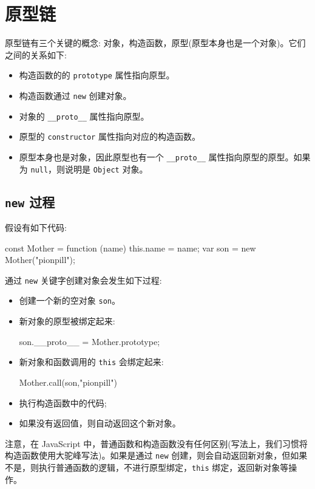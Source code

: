 \section{原型链}

原型链有三个关键的概念: 对象，构造函数，原型(原型本身也是一个对象)。它们之间的关系如下:
\begin{itemize}
  \item 构造函数的的 \texttt{prototype} 属性指向原型。
  \item 构造函数通过 \texttt{new} 创建对象。
  \item 对象的 \texttt{\_\_proto\_\_} 属性指向原型。
  \item 原型的 \texttt{constructor} 属性指向对应的构造函数。
  \item 原型本身也是对象，因此原型也有一个 \texttt{\_\_proto\_\_} 属性指向原型的原型。如果为 \texttt{null}，则说明是 \texttt{Object} 对象。
\end{itemize}

\subsection{\texttt{new} 过程}

假设有如下代码:

\begin{JavaScript}
const Mother = function (name) {
  this.name = name;
}
var son = new Mother("pionpill");
\end{JavaScript}

通过 \texttt{new} 关键字创建对象会发生如下过程:
\begin{itemize}
  \item 创建一个新的空对象 \texttt{son}。
  \item 新对象的原型被绑定起来:
\begin{JavaScript}
son.__proto__ = Mother.prototype;
\end{JavaScript}
\item 新对象和函数调用的 \texttt{this} 会绑定起来:
\begin{JavaScript}
Mother.call(son,"pionpill")
\end{JavaScript}
  \item 执行构造函数中的代码;
  \item 如果没有返回值，则自动返回这个新对象。
\end{itemize}

注意，在 JavaScript 中，普通函数和构造函数没有任何区别(写法上，我们习惯将构造函数使用大驼峰写法)。如果是通过 \texttt{new} 创建，则会自动返回新对象，但如果不是，则执行普通函数的逻辑，不进行原型绑定，\texttt{this} 绑定，返回新对象等操作。

